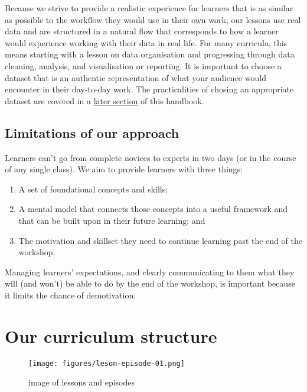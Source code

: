 \documentclass[
]{book}
\providecommand{\tightlist}{%
  \setlength{\itemsep}{0pt}\setlength{\parskip}{0pt}}
\begin{document}
Because we strive to provide a realistic experience for learners
that is as similar as possible to the workflow they would use
in their own work, our lessons use real data and are structured
in a natural flow that corresponds to how a learner would experience
working with their data in real life. For many curricula, this
means starting with a lesson on data organisation and progressing
through data cleaning, analysis, and visualisation or reporting.
It is important to choose a dataset that is an authentic
representation of what your audience would encounter in their
day-to-day work. The practicalities of chosing an appropriate
dataset are covered in a \protect\hyperlink{picking-a-dataset}{later section}
of this handbook.

\hypertarget{limitations-of-our-approach}{%
\section{Limitations of our approach}\label{limitations-of-our-approach}}

Learners can't go from complete novices to experts in two days (or
in the course of any single class). We aim to provide learners with
three things:

\begin{enumerate}
\def\labelenumi{\arabic{enumi}.}
\tightlist
\item
  A set of foundational concepts and skills;
\item
  A mental model that connects those concepts into a useful
  framework and that can be built upon in their future learning; and
\item
  The motivation and skillset they need to continue learning
  past the end of the workshop.
\end{enumerate}

Managing learners' expectations, and clearly communicating to
them what they will (and won't) be able to do by the end of the
workshop, is important because it limits the chance of demotivation.

\hypertarget{our-curriculum-structure}{%
\chapter{Our curriculum structure}\label{our-curriculum-structure}}

\begin{figure}
\centering
\texttt{[image: figures/leson-episode-01.png]}
\caption{image of lessons and episodes}
\end{figure}
\end{document}
